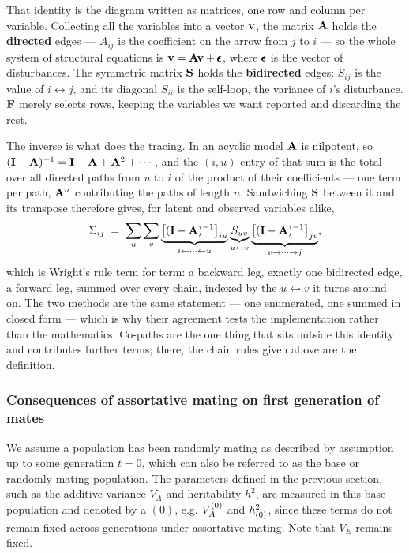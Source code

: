 \documentclass[12pt]{article}
\begin{document}
That identity is the diagram written as matrices, one row and column per variable.
Collecting all the variables into a vector $\mathbf{v}$, the matrix $\mathbf{A}$ holds the \textbf{directed} edges --- $A_{ij}$ is the coefficient on the arrow from $j$ to $i$ --- so the whole system of structural equations is $\mathbf{v} = \mathbf{A}\mathbf{v} + \pmb{\epsilon}$, where $\pmb{\epsilon}$ is the vector of disturbances.
The symmetric matrix $\mathbf{S}$ holds the \textbf{bidirected} edges: $S_{ij}$ is the value of $i \leftrightarrow j$, and its diagonal $S_{ii}$ is the self-loop, the variance of $i$'s disturbance.
$\mathbf{F}$ merely selects rows, keeping the variables we want reported and discarding the rest.

The inverse is what does the tracing.
In an acyclic model $\mathbf{A}$ is nilpotent, so $(\mathbf{I}-\mathbf{A})^{-1} = \mathbf{I} + \mathbf{A} + \mathbf{A}^2 + \cdots$, and the $(i,u)$ entry of that sum is the total over all directed paths from $u$ to $i$ of the product of their coefficients --- one term per path, $\mathbf{A}^n$ contributing the paths of length $n$.
Sandwiching $\mathbf{S}$ between it and its transpose therefore gives, for latent and observed variables alike,
$$
    \Sigma_{ij} \;=\; \sum_{u}\sum_{v}
    \underbrace{\big[(\mathbf{I}-\mathbf{A})^{-1}\big]_{iu}}_{i \leftarrow \cdots \leftarrow u}
    \underbrace{S_{uv}}_{u \leftrightarrow v}
    \underbrace{\big[(\mathbf{I}-\mathbf{A})^{-1}\big]_{jv}}_{v \rightarrow \cdots \rightarrow j} ,
$$
which is Wright's rule term for term: a backward leg, exactly one bidirected edge, a forward leg, summed over every chain, indexed by the $u \leftrightarrow v$ it turns around on.
The two methods are the same statement --- one enumerated, one summed in closed form --- which is why their agreement tests the implementation rather than the mathematics.
Co-paths are the one thing that sits outside this identity and contributes further terms; there, the chain rules given above are the definition.

\subsubsection{Consequences of assortative mating on first generation of mates}
We assume a population has been randomly mating as described by assumption  up to some generation $t=0$, which can also be referred to as the base or randomly-mating population.
The parameters defined in the previous section, such as the additive variance $V_A$ and heritability $h^2$, are measured in this base population and denoted by a $(0)$, e.g. $V_A^{(0)}$ and $h^2_{(0)}$, since these terms do not remain fixed across generations under assortative mating.
Note that $V_E$ remains fixed.
\end{document}
